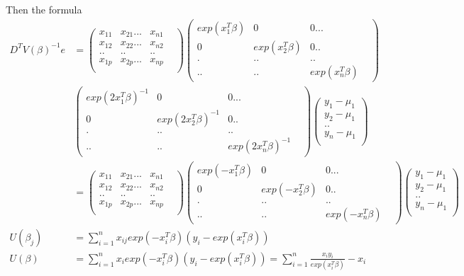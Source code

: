 Then the formula
\begin{align*}
	 D^T V(\beta)^{-1} e &=  \begin{pmatrix}
	 	x_{11} & x_{21} ... & x_{n1}  \\
	 	x_{12} & x_{22} ... & x_{n2}  \\
	 	.. &.. & ..&  \\
	 	x_{1p} & x_{2p} ... & x_{np} \\
	 \end{pmatrix} \begin{pmatrix}
	 exp(x_1^T \beta) & 0  & 0...& \\
	 0 & exp(x_2^T \beta) & 0 ..& \\
	 .&..&..&  \\
	 ..& ..&  exp(x_n^T \beta)
 \end{pmatrix}\\
& \begin{pmatrix}
 exp(2 x_1^T \beta)^{-1} & 0  & 0...& \\
 0 & exp(2 x_2^T \beta)^{-1} & 0 ..& \\
 .&..&..&  \\
 ..& ..&  exp(2 x_n^T \beta)^{-1}
\end{pmatrix} \begin{pmatrix}
y_{1} - \mu_1  \\
y_{2}- \mu_1 \\
..  \\
y_{n}- \mu_1\\
\end{pmatrix}\\
&= \begin{pmatrix}
	x_{11} & x_{21} ... & x_{n1}  \\
	x_{12} & x_{22} ... & x_{n2}  \\
	.. &.. & ..&  \\
	x_{1p} & x_{2p} ... & x_{np} \\
\end{pmatrix} \begin{pmatrix}
	exp(-x_1^T \beta) & 0  & 0...& \\
	0 & exp(-x_2^T \beta) & 0 ..& \\
	.&..&..&  \\
	..& ..&  exp(-x_n^T \beta)
\end{pmatrix}\begin{pmatrix}
y_{1} - \mu_1  \\
y_{2}- \mu_1 \\
..  \\
y_{n}- \mu_1\\
\end{pmatrix}\\
U(\beta_j) &= \sum_{i=1}^n x_{ij} exp(-x_i^T \beta) (y_i - exp(x_i^T \beta))\\
U(\beta) &= \sum_{i=1}^n x_{i} exp(-x_i^T \beta) (y_i - exp(x_i^T \beta)) = \sum_{i=1}^n \frac{x_i y_i}{exp(x_i^T \beta)} - x_i
\end{align*}

